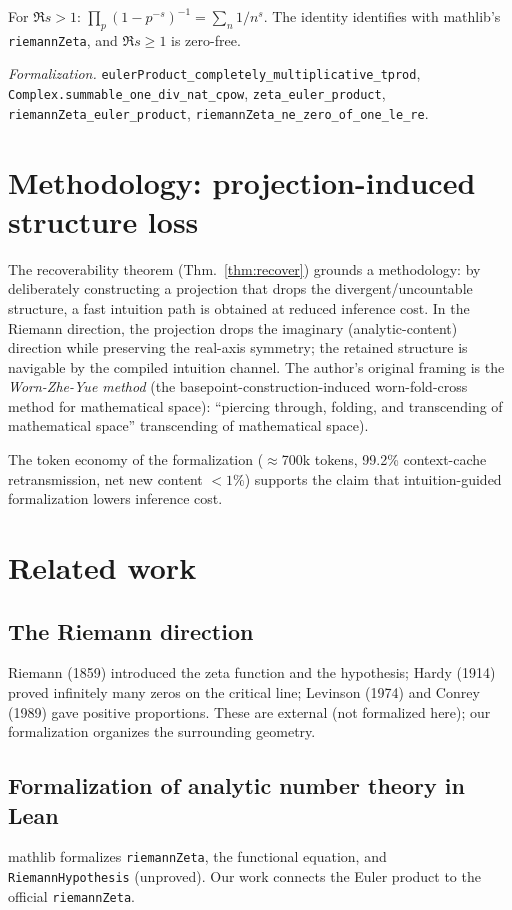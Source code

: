 \documentclass[sigplan,10pt,anonymous,review]{acmart}
\begin{document}
\begin{theorem}\label{thm:euler}
For $\Re s > 1$: $\prod_p (1-p^{-s})^{-1} = \sum_n 1/n^s$. The identity identifies
with mathlib's \texttt{riemannZeta}, and $\Re s \ge 1$ is zero-free.
\end{theorem}
\emph{Formalization.} \texttt{eulerProduct\_completely\_multiplicative\_tprod},
\texttt{Complex.summable\_one\_div\_nat\_cpow},
\texttt{zeta\_euler\_product}, \texttt{riemannZeta\_euler\_product},
\texttt{riemannZeta\_ne\_zero\_of\_one\_le\_re}.

\section{Methodology: projection-induced structure loss}

The recoverability theorem (Thm.~\ref{thm:recover}) grounds a methodology: by
deliberately constructing a projection that drops the divergent/uncountable structure,
a fast intuition path is obtained at reduced inference cost. In the Riemann direction,
the projection drops the imaginary (analytic-content) direction while preserving the
real-axis symmetry; the retained structure is navigable by the compiled intuition
channel. The author's original framing is the \emph{Worn-Zhe-Yue method}
(the basepoint-construction-induced worn-fold-cross method for mathematical space): ``piercing through, folding, and transcending of mathematical space''
transcending of mathematical space).

The token economy of the formalization ($\approx$700k tokens, 99.2\% context-cache
retransmission, net new content $<1\%$) supports the claim that intuition-guided
formalization lowers inference cost.

\section{Related work}

\subsection{The Riemann direction}
Riemann (1859) introduced the zeta function and the hypothesis; Hardy (1914) proved
infinitely many zeros on the critical line; Levinson (1974) and Conrey (1989) gave
positive proportions. These are external (not formalized here); our formalization
organizes the surrounding geometry.

\subsection{Formalization of analytic number theory in Lean}
mathlib formalizes \texttt{riemannZeta}, the functional equation, and
\texttt{RiemannHypothesis} (unproved). Our work connects the Euler product to the
official \texttt{riemannZeta}.
\end{document}
